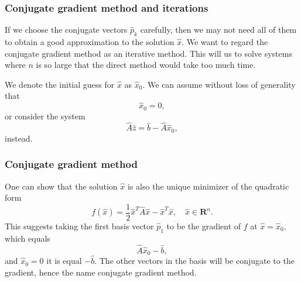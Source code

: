 \documentclass{beamer}
\begin{document}
\begin{frame}
\frametitle{Conjugate gradient method and iterations}

\begin{block}{}

If we choose the conjugate vectors $\hat{p}_k$ carefully, 
then we may not need all of them to obtain a good approximation to the solution 
$\hat{x}$. 
We want to regard the conjugate gradient method as an iterative method. 
This will us to solve systems where $n$ is so large that the direct 
method would take too much time.

We denote the initial guess for $\hat{x}$ as $\hat{x}_0$. 
We can assume without loss of generality that
\begin{equation*}
\hat{x}_0=0,
\end{equation*}
or consider the system
\begin{equation*}
\hat{A}\hat{z} = \hat{b}-\hat{A}\hat{x}_0,
\end{equation*}
instead.
\end{block}
\end{frame}

\begin{frame}
\frametitle{Conjugate gradient method}

\begin{block}{}
One can show that the solution $\hat{x}$ is also the unique minimizer of the quadratic form
\begin{equation*}
  f(\hat{x}) = \frac{1}{2}\hat{x}^T\hat{A}\hat{x} - \hat{x}^T \hat{x} , \quad \hat{x}\in\mathbf{R}^n. 
\end{equation*}
This suggests taking the first basis vector $\hat{p}_1$ 
to be the gradient of $f$ at $\hat{x}=\hat{x}_0$, 
which equals
\begin{equation*}
\hat{A}\hat{x}_0-\hat{b},
\end{equation*}
and 
$\hat{x}_0=0$ it is equal $-\hat{b}$.
The other vectors in the basis will be conjugate to the gradient, 
hence the name conjugate gradient method.
\end{block}
\end{frame}
\end{document}
